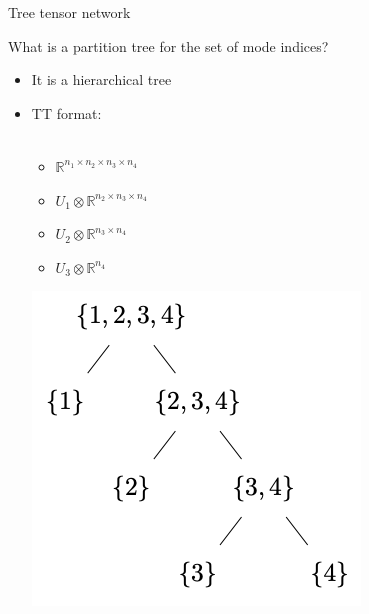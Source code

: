 \documentclass{beamer}
\newcommand{\bitem}{\item[$\bullet$]}
\begin{document}
\begin{frame}{Tree tensor network}

\begin{center}
What is a partition tree for the set of mode indices?
\end{center}
\pause
\begin{itemize}
    \bitem It is a hierarchical tree 
    \bitem TT format:\\
    ~\\
    \begin{minipage}{4cm}
    \begin{itemize}
        \item[] $\mathbb{R}^{n_1\times n_2 \times n_3 \times n_4}$
        \vspace{4mm}
        \item[] $U_1\otimes \mathbb{R}^{n_2 \times n_3 \times n_4}$ \vspace{5mm}
        \item[] $U_2\otimes \mathbb{R}^{n_3 \times n_4}$ \vspace{4mm}
        \item[] $U_3\otimes \mathbb{R}^{n_4}$ \vspace{4mm}
    \end{itemize}
    \end{minipage}
    \hspace{6mm}
    \begin{minipage}{4cm}
        \includegraphics[width =\textwidth]{Graphics/TTTensorTree.png}
    \end{minipage}
    \hfill
\end{itemize}



    
\end{frame}
\end{document}
